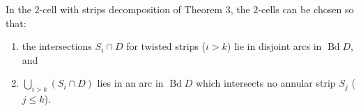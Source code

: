 In the $2$-cell with strips decomposition of Theorem 3, the $2$-cells can be chosen so that:
\begin{enumerate}
\item[(a)] the intersections $S_i \cap D$ for twisted strips ($i > k$) lie in disjoint arcs in $\operatorname{Bd} D$, and
\item[(b)] $\bigcup_{i > k} (S_i \cap D)$ lies in an arc in $\operatorname{Bd} D$ which intersects no annular strip $S_j$ ($j \leqslant k$).
\end{enumerate}
